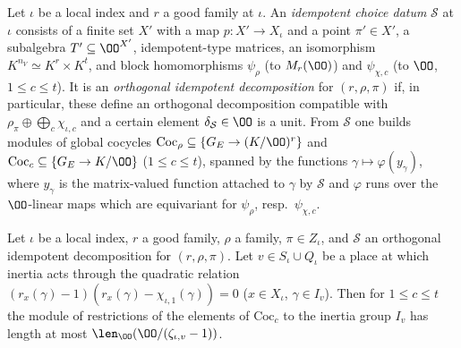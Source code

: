 Let $\iota$ be a local index and $r$ a good family at $\iota$. An \emph{idempotent choice datum} $\mathcal S$ at $\iota$ consists of a finite set
$X'$ with a map $p\colon X'\to X_\iota$ and a point $\pi'\in X'$, a subalgebra $T'\subseteq\OO^{X'}$, idempotent-type matrices, an isomorphism
$K^{n_V}\simeq K^r\times K^t$, and block homomorphisms $\psi_\rho$ (to $M_r(\OO)$) and $\psi_{\chi,c}$ (to $\OO$, $1\le c\le t$). It is an
\emph{orthogonal idempotent decomposition} for $(r,\rho,\pi)$ if, in particular, these define an orthogonal decomposition compatible with
$\rho_\pi\oplus\bigoplus_c\chi_{\iota,c}$ and a certain element $\delta_{\mathcal S}\in\OO$ is a unit. From $\mathcal S$ one builds modules of global
cocycles $\mathrm{Coc}_\rho\subseteq\{G_E\to(K/\OO)^r\}$ and $\mathrm{Coc}_c\subseteq\{G_E\to K/\OO\}$ ($1\le c\le t$), spanned by the functions
$\gamma\mapsto\varphi(y_\gamma)$, where $y_\gamma$ is the matrix-valued function attached to $\gamma$ by $\mathcal S$ and $\varphi$ runs over the
$\OO$-linear maps which are equivariant for $\psi_\rho$, resp.\ $\psi_{\chi,c}$.

\begin{lemma}\label{pf:linkN-sel:quad}
Let $\iota$ be a local index, $r$ a good family, $\rho$ a family, $\pi\in Z_\iota$, and $\mathcal S$ an orthogonal idempotent decomposition for
$(r,\rho,\pi)$. Let $v\in S_\iota\cup Q_\iota$ be a place at which inertia acts through the quadratic relation
$(r_x(\gamma)-1)(r_x(\gamma)-\chi_{\iota,1}(\gamma))=0$ ($x\in X_\iota$, $\gamma\in I_v$). Then for $1\le c\le t$ the module of restrictions of the
elements of $\mathrm{Coc}_c$ to the inertia group $I_v$ has length at most $\len_\OO(\OO/(\zeta_{\iota,v}-1))$.
\end{lemma}


